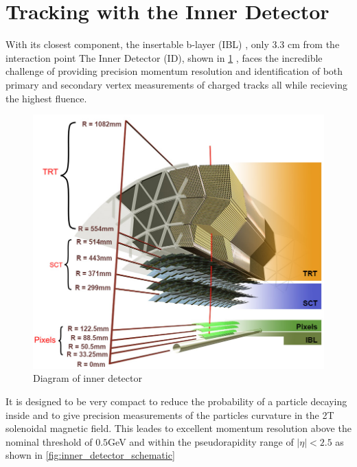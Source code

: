 \section{Tracking with the Inner Detector} \label{sec:atlas:tracking}

With its closest component, the insertable b-layer (IBL)
\cite{Potamianos:2209070}, only 3.3 cm from the interaction point The Inner
Detector (ID), shown in \cref{fig:inner_detector_diagram}
\cite{ATLAS-TDR-4,ATLAS-TDR-5}, faces the incredible challenge of providing
precision momentum resolution and identification of both primary and secondary
vertex measurements of charged tracks all while recieving the highest fluence.

\begin{figure}[!htbp]
  \begin{center}
    \includegraphics[width=0.8\linewidth]{figures/atlas/inner_detector_diagram}
    \caption{ \cite{Potamianos:2209070} Diagram of inner detector}
    \label{fig:inner_detector_diagram}
  \end{center}
\end{figure}

It is designed to be very compact to reduce the probability of a particle
decaying inside and to give precision measurements of the particles curvature in
the 2T solenoidal magnetic field. This leades to excellent momentum resolution
above the nominal \pT threshold of $0.5$GeV and within the pseudorapidity range
of $|\eta| < 2.5$ as shown in \cref{fig:inner_detector_schematic}

